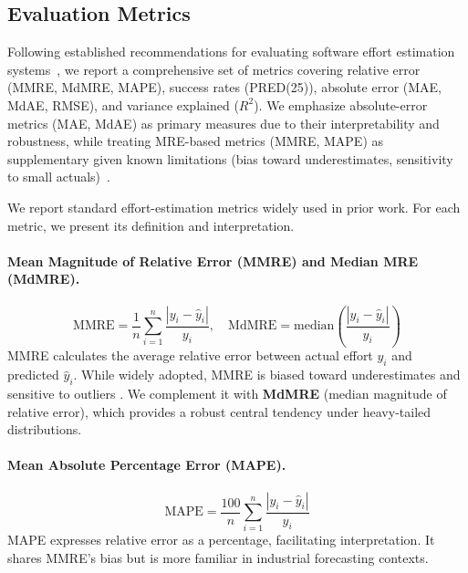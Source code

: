 \documentclass{ieeeaccess}
\begin{document}
\subsection{Evaluation Metrics}
\label{sec:evaluation-metrics}

Following established recommendations for evaluating software effort estimation systems~\cite{shepperd2012evaluating,kitchenham2001evaluating}, we report a comprehensive set of metrics covering relative error (MMRE, MdMRE, MAPE), success rates (PRED(25)), absolute error (MAE, MdAE, RMSE), and variance explained ($R^2$). We emphasize absolute-error metrics (MAE, MdAE) as primary measures due to their interpretability and robustness, while treating MRE-based metrics (MMRE, MAPE) as supplementary given known limitations (bias toward underestimates, sensitivity to small actuals)~\cite{foss2003bias,shepperd2012evaluating}.

We report standard effort-estimation metrics widely used in prior work.
For each metric, we present its definition and interpretation.

\paragraph{Mean Magnitude of Relative Error (MMRE) and Median MRE (MdMRE).}
\begin{equation}
\mathrm{MMRE} = \frac{1}{n}\sum_{i=1}^{n}\frac{|y_i-\hat{y}_i|}{y_i}, \quad
\mathrm{MdMRE} = \text{median}\left(\frac{|y_i-\hat{y}_i|}{y_i}\right)
\label{eq:mmre-mdmre}
\end{equation}
MMRE calculates the average relative error between actual effort $y_i$ and predicted $\hat{y}_i$. While widely adopted, MMRE is biased toward underestimates and sensitive to outliers \cite{kitchenham2001evaluating,foss2003bias}. We complement it with \textbf{MdMRE} (median magnitude of relative error), which provides a robust central tendency under heavy-tailed distributions.

\paragraph{Mean Absolute Percentage Error (MAPE).}
\begin{equation}
\mathrm{MAPE} = \frac{100}{n}\sum_{i=1}^{n}\frac{|y_i-\hat{y}_i|}{y_i}
\label{eq:mape}
\end{equation}
MAPE expresses relative error as a percentage, facilitating interpretation. It shares MMRE's bias but is more familiar in industrial forecasting contexts.
\end{document}
